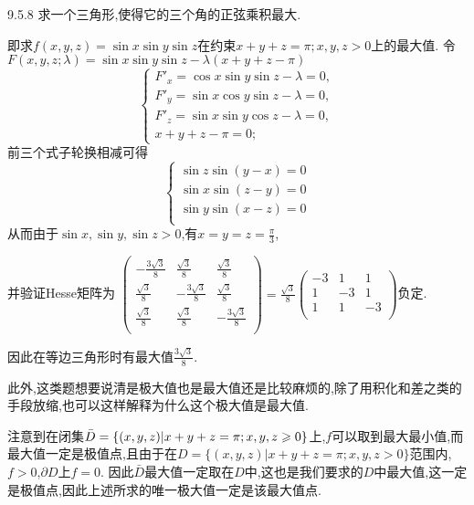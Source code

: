\begin{exercise}{9.5.8}
    求一个三角形,使得它的三个角的正弦乘积最大.
\end{exercise}
\begin{solution}
    即求$f(x,y,z)=\sin x\sin y\sin z$在约束$x+y+z=\pi;x,y,z>0$上的最大值.
    令$F(x,y,z;\lambda)=\sin x\sin y\sin z-\lambda(x+y+z-\pi)$
    $$\begin{cases}
        F'_x=\cos x\sin y\sin z-\lambda=0,\\
        F'_y=\sin x\cos y\sin z-\lambda=0,\\
        F'_z=\sin x\sin y\cos z-\lambda=0,\\
        x+y+z-\pi=0;
    \end{cases}$$
    前三个式子轮换相减可得
    $$\begin{cases}
        \sin z \sin(y-x)=0\\
        \sin x \sin(z-y)=0\\
        \sin y \sin(x-z)=0\\
    \end{cases}$$
    从而由于$\sin x,\sin y,\sin z>0$,有$x=y=z=\frac{\pi}{3}$,

    并验证Hesse矩阵为
    $\begin{pmatrix}
        -\frac{3\sqrt{3}}{8}&\frac{\sqrt{3}}{8}&\frac{\sqrt{3}}{8}\\
        \frac{\sqrt{3}}{8}&-\frac{3\sqrt{3}}{8}&\frac{\sqrt{3}}{8}\\
        \frac{\sqrt{3}}{8}&\frac{\sqrt{3}}{8}&-\frac{3\sqrt{3}}{8}\\
    \end{pmatrix}=\frac{\sqrt{3}}{8}\begin{pmatrix}
        -3&1&1\\
        1&-3&1\\
        1&1&-3\\
    \end{pmatrix}$负定.

    因此在等边三角形时有最大值$\frac{3\sqrt{3}}{8}$.

    此外,这类题想要说清是极大值也是最大值还是比较麻烦的,除了用积化和差之类的手段放缩,也可以这样解释为什么这个极大值是最大值.

    注意到在闭集$\bar{D}=\{(x,y,z)|x+y+z=\pi;x,y,z\geqslant0\}$上,$f$可以取到最大最小值,而最大值一定是极值点,且由于在$D=\{(x,y,z)|x+y+z=\pi;x,y,z>0\}$范围内,$f>0$,$\partial D$上$f=0$.
    因此$\bar{D}$最大值一定取在$D$中,这也是我们要求的$D$中最大值,这一定是极值点,因此上述所求的唯一极大值一定是该最大值点.
\end{solution}

